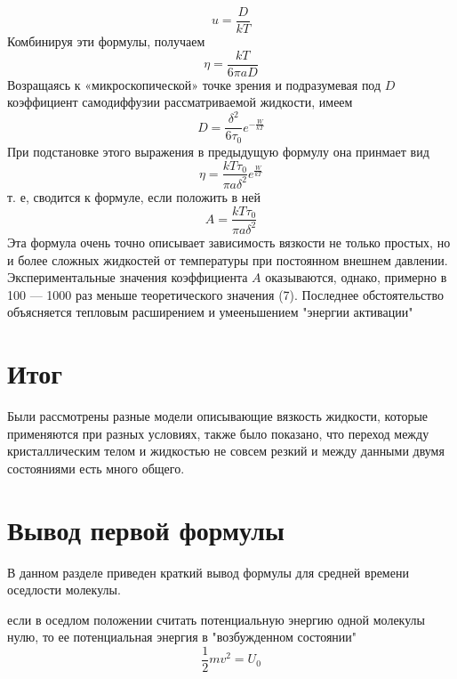 \documentclass[a4paper, 12pt]{article}
\begin{document}
\[u = \frac{D}{kT}\]
Комбинируя эти формулы, получаем
\[\eta = \frac{kT}{6\pi aD}\]
Возращаясь к «микроскопической» точке зрения и подразумевая под $D$ коэффициент самодиффузии рассматриваемой жидкости, имеем
\[D = \frac{\delta^2}{6\tau_0}e^{-\frac{W}{kT}}\]
При подстановке этого выражения в предыдущую формулу она принмает вид
\[\eta = \frac{kT\tau_0}{\pi a \delta^2} e^{\frac{W}{kT}}\]
т. е, сводится к формуле, если положить в ней
\[A = \frac{kT\tau_0}{\pi a \delta^2}\]
Эта формула очень точно описывает зависимость вязкости не только простых, но и более сложных жидкостей от температуры 
при постоянном внешнем давлении. Экспериментальные значения коэффициента $A$ оказываются, однако, примерно в 100 — 1000 
раз меньше теоретического значения (7). Последнее обстоятельство объясняется тепловым расширением и умееньшением "энергии активации"

\section{Итог}
Были рассмотрены разные модели описывающие вязкость жидкости, которые применяются при разных условиях, также было показано,
что переход между кристаллическим телом и жидкостью не совсем резкий и между данными двумя состояниями есть много общего.




\section{Вывод первой формулы}
В данном разделе приведен краткий вывод формулы для средней времени оседлости молекулы.

если в оседлом положении считать потенциальную энергию одной молекулы нулю, то ее потенциальная энергия в "возбужденном состоянии"
\[\frac{1}{2}mv^2 = U_0\]
\end{document}
